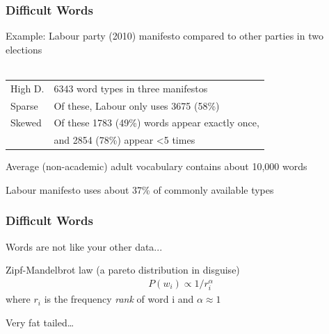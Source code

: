 \documentclass[11pt,compress,professionalfonts]{beamer}
\begin{document}
\begin{frame}[t]\frametitle{Difficult Words}

Example: Labour party (2010) manifesto compared to other parties in two elections\\
~\\
\begin{tabular}{ll}
High D. & 6343 word types in three manifestos \\
Sparse & Of these, Labour only uses 3675 (58\%)\\
Skewed &  Of these 1783 (49\%) words appear exactly once,\\
&  and 2854 (78\%) appear <5 times
\end{tabular}

Average (non-academic) adult vocabulary contains about 10,000 words

Labour manifesto uses about 37\% of commonly available types



\end{frame}
\begin{frame}[t]\frametitle{Difficult Words}

Words are not like your other data...

Zipf-Mandelbrot law (a pareto distribution in disguise)
\begin{align*}
P(w_i) \propto 1/{r_i^\alpha}
\end{align*}
where $r_i$ is the frequency \textsl{rank} of word i and $\alpha\approx 1$

Very fat tailed\ldots

\end{frame}
\end{document}
